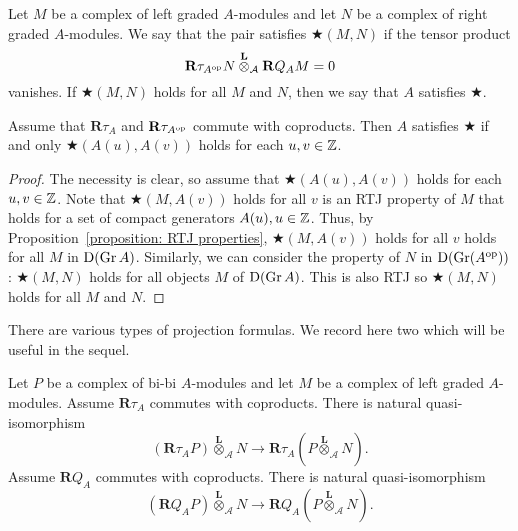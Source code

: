 \documentclass[dissertation.tex]{subfiles}
\begin{document}
\begin{definition} \label{definition: tensor vanishing}
  Let \(M\) be a complex of left graded \(A\)-modules and let \(N\) be a complex of right graded \(A\)-modules. We say that the pair satisfies \(\bigstar(M,N)\) if the tensor product
  \begin{displaymath}
    \mathbf{R} \tau_{A^{\operatorname{op}}} N \overset{\mathbf{L}}{\otimes}_{\mathcal A} \mathbf{R} Q_A M = 0
  \end{displaymath}
  vanishes. If \(\bigstar(M,N)\) holds for all \(M\) and \(N\), then we say that \(A\) satisfies \(\bigstar\). 
\end{definition}

\begin{proposition} \label{proposition: big star condition}
  Assume that \(\mathbf{R}\tau_A\) and \(\mathbf{R}\tau_{A^{\operatorname{op}}}\) commute with coproducts. Then \(A\) satisfies \(\bigstar\) if and only \(\bigstar( A(u), A(v) )\) holds for each \(u,v \in \mathbb{Z}\).
\end{proposition}

\begin{proof}
  The necessity is clear, so assume that \(\bigstar( A(u), A(v) )\) holds for each \(u,v \in \mathbb{Z}\). Note that \(\bigstar(M , A(v))\) holds for all \(v\) is an RTJ property of \(M\) that holds for a set of compact generators \(A(u), u \in \mathbb{Z}\). Thus, by Proposition~\ref{proposition: RTJ properties}, \(\bigstar(M , A(v))\) holds for all \(v\) holds for all \(M\) in \(\mathrm{D}(\operatorname{Gr}A)\). Similarly, we can consider the property of \(N\) in \(\mathrm{D}(\operatorname{Gr}(A^{\operatorname{op}}))\): \(\bigstar(M , N)\) holds for all objects \(M\) of \(\mathrm{D}(\operatorname{Gr}A)\). This is also RTJ so \(\bigstar(M,N)\) holds for all \(M\) and \(N\).
\end{proof}

There are various types of projection formulas.
We record here two which will be useful in the sequel.

\begin{proposition} \label{proposition: projection formula}
  Let \(P\) be a complex of bi-bi \(A\)-modules and let \(M\) be a complex of left graded \(A\)-modules. Assume \(\mathbf{R} \tau_A\) commutes with coproducts. There is natural quasi-isomorphism
  \begin{displaymath}
    ( \mathbf{R} \tau_A P ) \overset{\mathbf{L}}{\otimes}_{\mathcal A} N \to \mathbf{R} \tau_A \left( P \overset{\mathbf{L}}{\otimes}_{\mathcal A} N \right).
  \end{displaymath}
  Assume \(\mathbf{R} Q_A\) commutes with coproducts. There is natural quasi-isomorphism
  \begin{displaymath}
    ( \mathbf{R} Q_A P ) \overset{\mathbf{L}}{\otimes}_{\mathcal A} N \to \mathbf{R} Q_A \left( P \overset{\mathbf{L}}{\otimes}_{\mathcal A} N \right).
  \end{displaymath}
\end{proposition}
\end{document}
